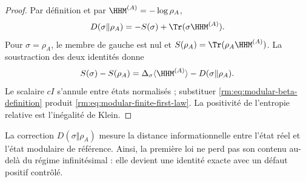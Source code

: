 \begin{proof}
Par définition et par \(\HHM^{(A)}=-\log\rho_A\),
\[
D(\sigma\Vert\rho_A)
=-S(\sigma)+\Tr(\sigma\HHM^{(A)}).
\]
Pour \(\sigma=\rho_A\), le membre de gauche est nul et \(S(\rho_A)=\Tr(\rho_A\HHM^{(A)})\). La soustraction des deux identités donne
\[
S(\sigma)-S(\rho_A)
=\Delta_\sigma\langle\HHM^{(A)}\rangle
-D(\sigma\Vert\rho_A).
\]
Le scalaire \(cI\) s’annule entre états normalisés ; substituer \cref{rm:eq:modular-beta-definition} produit \cref{rm:eq:modular-finite-first-law}. La positivité de l’entropie relative est l’inégalité de Klein.
\end{proof}

La correction \(D(\sigma\Vert\rho_A)\) mesure la distance informationnelle entre l’état réel et l’état modulaire de référence. Ainsi, la première loi ne perd pas son contenu au-delà du régime infinitésimal : elle devient une identité exacte avec un défaut positif contrôlé.
